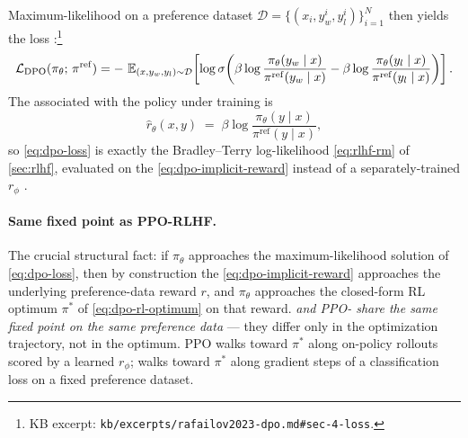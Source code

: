 Maximum-likelihood on a preference dataset
$\mathcal{D} = \{(x_i, y_w^i, y_l^i)\}_{i=1}^N$ then yields the 
loss \citep[\S 4, Eq.~7]{rafailov2023-dpo}:\footnote{KB excerpt:
\texttt{kb/excerpts/rafailov2023-dpo.md\#sec-4-loss}.}
\begin{equation}
\mathcal{L}_{\mathrm{DPO}}(\pi_\theta;\, \pi^{\mathrm{ref}})
  = -\, \operatorname{\mathbb{E}}_{(x, y_w, y_l) \sim \mathcal{D}}
      \!\left[
        \log \sigma\!\left(
          \beta \log \frac{\pi_\theta(y_w \mid x)}{\pi^{\mathrm{ref}}(y_w \mid x)}
          - \beta \log \frac{\pi_\theta(y_l \mid x)}{\pi^{\mathrm{ref}}(y_l \mid x)}
        \right)
      \right].
\label{eq:dpo-loss}
\end{equation}
The  associated with the policy under training is
\begin{equation}
\hat{r}_\theta(x, y)
  \;=\; \beta \log \frac{\pi_\theta(y \mid x)}{\pi^{\mathrm{ref}}(y \mid x)},
\label{eq:dpo-implicit-reward}
\end{equation}
so \cref{eq:dpo-loss} is exactly the Bradley--Terry log-likelihood
\cref{eq:rlhf-rm} of \cref{sec:rlhf}, evaluated on the 
\cref{eq:dpo-implicit-reward} instead of a separately-trained
$r_\phi$ \citep[\S 4]{rafailov2023-dpo}.

\paragraph{Same fixed point as PPO-RLHF.} The crucial structural fact:
if $\pi_\theta$ approaches the maximum-likelihood solution of
\cref{eq:dpo-loss}, then by construction the 
\cref{eq:dpo-implicit-reward} approaches the underlying preference-data
reward $r$, and $\pi_\theta$ approaches the closed-form RL optimum
$\pi^*$ of \cref{eq:dpo-rl-optimum} on that reward. \emph{ and
PPO- share the same fixed point on the same preference data}
\citep[\S 4]{rafailov2023-dpo} --- they differ only in the optimization
trajectory, not in the optimum. PPO walks toward $\pi^*$ along on-policy
rollouts scored by a learned $r_\phi$;  walks toward $\pi^*$ along
gradient steps of a classification loss on a fixed preference dataset.

